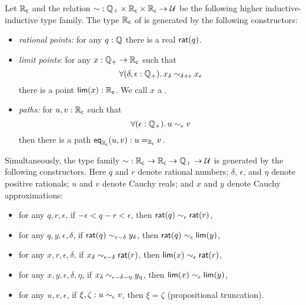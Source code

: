 \begin{defn}\label{defn:cauchy-reals}
  Let $\RC$ and the relation $\closesym:\Qp \times \RC \times \RC \to \type$ be the following higher inductive-inductive type family.
  The type $\RC$ of 
  is generated by the following constructors:
  \begin{itemize}
  \item \emph{rational points:} 
    for any $q : \Q$ there is a real $\rcrat(q)$.
  \item \emph{limit points}:
    for any $x : \Qp \to \RC$ such that
    \begin{equation}
      \label{eq:RC-cauchy}
      \fall{\delta, \epsilon : \Qp} x_\delta \close{\delta + \epsilon} x_\epsilon
    \end{equation}
    there is a point $\rclim(x) : \RC$. We call $x$ a .
  \item \emph{paths:}
    for $u, v : \RC$ such that
    \begin{equation}
      \label{eq:RC-path}
      \fall{\epsilon : \Qp} u \close\epsilon v
    \end{equation}
    then there is a path $\rceq(u, v) : \id[\RC]{u}{v}$.
  \end{itemize}
  Simultaneously, the type family $\closesym:\RC\to\RC\to\Qp \to\type$ is generated by the following constructors.
  Here $q$ and $r$ denote rational numbers; $\delta$, $\epsilon$, and $\eta$ denote positive rationals; $u$ and $v$ denote Cauchy reals; and $x$ and $y$ denote Cauchy approximations:
  \begin{itemize}
  \item for any $q,r,\epsilon$, if $-\epsilon < q - r < \epsilon$, then $\rcrat(q) \close\epsilon \rcrat(r)$,
  \item for any $q,y,\epsilon,\delta$, if $\rcrat(q) \close{\epsilon - \delta} y_\delta$, then $\rcrat(q) \close{\epsilon} \rclim(y)$,
  \item for any $x,r,\epsilon,\delta$, if $x_\delta \close{\epsilon - \delta} \rcrat(r)$, then $\rclim(x) \close\epsilon \rcrat(r)$,
  \item for any $x,y,\epsilon,\delta,\eta$, if $x_\delta \close{\epsilon - \delta - \eta} y_\eta$, then $\rclim(x) \close\epsilon \rclim(y)$,
  \item for any $u,v,\epsilon$, if $\xi,\zeta : u \close{\epsilon} v$, then $\xi=\zeta$ (propositional truncation).
  \end{itemize}
\end{defn}

